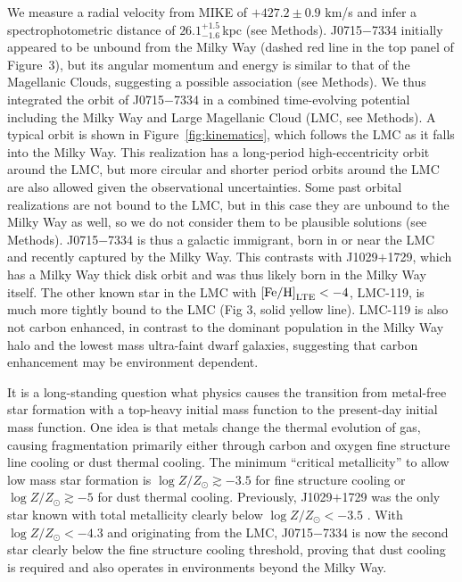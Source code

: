 \documentclass{natureprintstyle}
\newcommand{\logzzsun}{\ensuremath{\log Z/Z_\odot}\xspace}
\newcommand{\umpstar}{J0715$-$7334\xspace}
\newcommand{\caffaustar}{J1029$+$1729\xspace}
\begin{document}
We measure a radial velocity from MIKE of $+427.2 \pm 0.9$ km/s and infer a spectrophotometric distance of $26.1^{+1.5}_{-1.6}$\,kpc (see Methods). \umpstar initially appeared to be unbound from the Milky Way (dashed red line in the top panel of Figure~3), but its angular momentum and energy is similar to that of the Magellanic Clouds, suggesting a possible association (see Methods). We thus integrated the orbit of \umpstar in a combined time-evolving potential including the Milky Way and Large Magellanic Cloud (LMC, see Methods). A typical orbit is shown in Figure~\ref{fig:kinematics}, which follows the LMC as it falls into the Milky Way. 
This realization has a long-period high-eccentricity orbit around the LMC, but more circular and shorter period orbits around the LMC are also allowed given the observational uncertainties.
Some past orbital realizations are not bound to the LMC, but in this case they are unbound to the Milky Way as well, so we do not consider them to be plausible solutions (see Methods). 
\umpstar is thus a galactic immigrant, born in or near the LMC and recently captured by the Milky Way. This contrasts with \caffaustar, which has a Milky Way thick disk orbit\cite{Sestito2019,Caffau2024} and was thus likely born in the Milky Way itself. 
The other known star in the LMC with $\mbox{[Fe/H]}_{\rm LTE}<-4$, LMC-119\cite{Chiti2024}, is much more tightly bound to the LMC (Fig 3, solid yellow line). LMC-119 is also not carbon enhanced, in contrast to the dominant population in the Milky Way halo\cite{Christlieb2002,Frebel2005,Frebel2015} and the lowest mass ultra-faint dwarf galaxies\cite{Ji2020,Chiti2025}, suggesting that carbon enhancement may be environment dependent\cite{Chiti2024}.

It is a long-standing question what physics causes the transition from metal-free star formation with a top-heavy initial mass function to the present-day initial mass function\cite{Bromm2009,Klessen2023,Frebel2015}. One idea is that metals change the thermal evolution of gas, causing fragmentation primarily either through carbon and oxygen fine structure line cooling or dust thermal cooling\cite{Schneider2003,Schneider2012,Bromm2003}.
The minimum ``critical metallicity'' to allow low mass star formation is $\logzzsun \gtrsim -3.5$ for fine structure cooling\cite{Bromm2003,Frebel2007} or $\logzzsun \gtrsim -5$ for dust thermal cooling\cite{Schneider2003,Schneider2012,Schneider2012b,Chiaki2017}. Previously, \caffaustar was the only star known with total metallicity clearly below $\logzzsun < -3.5$ \cite{Caffau2011}. With $\logzzsun < -4.3$ and originating from the LMC, \umpstar is now the second star clearly below the fine structure cooling threshold, proving that dust cooling is required and also operates in environments beyond the Milky Way.
\end{document}

